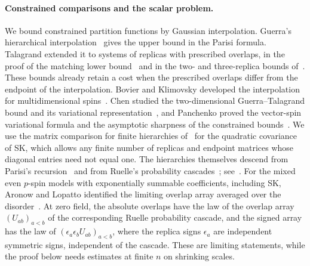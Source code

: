 \paragraph{Constrained comparisons and the scalar problem.}
We bound constrained partition functions by Gaussian interpolation.
Guerra's hierarchical interpolation~\cite{guerra-2003} gives the upper bound
in the Parisi formula. Talagrand extended it to systems of replicas with
prescribed overlaps, in the proof of the matching lower
bound~\cite[Section~3]{parisi-formula} and in the two- and three-replica
bounds of~\cite[Propositions~3.4 and~4.4]{talagrand-2007}. These bounds
already retain a cost when the prescribed overlaps differ from the endpoint
of the interpolation. Bovier and Klimovsky developed the interpolation for
multidimensional spins~\cite{bovier-klimovsky-2009}. Chen studied the
two-dimensional Guerra--Talagrand bound and its variational
representation~\cite{chen-2017}, and Panchenko proved the vector-spin
variational formula and the asymptotic sharpness of the constrained
bounds~\cite{panchenko-2018}. We use the matrix comparison for finite hierarchies
of~\cite[Proposition~2.3]{oai-barriers} for the quadratic covariance of SK,
which allows any finite number of replicas and endpoint matrices whose
diagonal entries need not equal one. The hierarchies themselves descend from Parisi's
recursion~\cite{parisi-1979} and from Ruelle's probability
cascades~\cite{ruelle-1987}; see~\cite{panchenko-2013}. For the mixed even
$p$-spin models with exponentially summable coefficients, including SK,
Aronow and Lopatto identified the limiting overlap array averaged over the
disorder~\cite[Theorems~1.1 and~1.2]{al-overlap-structure}. At zero field, the
absolute overlaps have the law of the overlap array $(U_{ab})_{a<b}$ of the
corresponding Ruelle probability cascade, and the signed array has the law of
$(\epsilon_a\epsilon_bU_{ab})_{a<b}$, where the replica signs $\epsilon_a$
are independent symmetric signs, independent of the cascade. These are
limiting statements, while the proof below needs estimates at finite $n$ on
shrinking scales.

